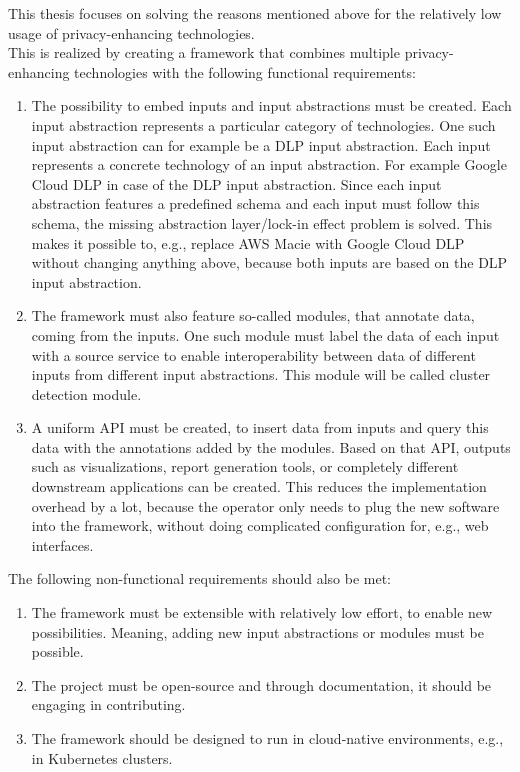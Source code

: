 


\graphicspath{{5/figures/}}

This thesis focuses on solving the reasons mentioned above for the relatively low usage of privacy-enhancing technologies. \\

This is realized by creating a framework that combines multiple privacy-enhancing technologies with the following functional requirements:
\begin{enumerate}
    \item The possibility to embed inputs and input abstractions must be created. Each input abstraction represents a particular category of technologies. One such input abstraction can for example be a DLP input abstraction. Each input represents a concrete technology of an input abstraction. For example Google Cloud DLP in case of the DLP input abstraction. Since each input abstraction features a predefined schema and each input must follow this schema, the missing abstraction layer/lock-in effect problem is solved. This makes it possible to, e.g., replace AWS Macie with Google Cloud DLP without changing anything above, because both inputs are based on the DLP input abstraction.
    \item The framework must also feature so-called modules, that annotate data, coming from the inputs. One such module must label the data of each input with a source service to enable interoperability between data of different inputs from different input abstractions. This module will be called cluster detection module.
    \item A uniform API must be created, to insert data from inputs and query this data with the annotations added by the modules. Based on that API, outputs such as visualizations, report generation tools, or completely different downstream applications can be created. This reduces the implementation overhead by a lot, because the operator only needs to plug the new software into the framework, without doing complicated configuration for, e.g., web interfaces.
\end{enumerate}
The following non-functional requirements should also be met:
\begin{enumerate}
    \item The framework must be extensible with relatively low effort, to enable new possibilities. Meaning, adding new input abstractions or modules must be possible.
    \item The project must be open-source and through documentation, it should be engaging in contributing.
    \item The framework should be designed to run in cloud-native environments, e.g., in Kubernetes clusters.
\end{enumerate}

